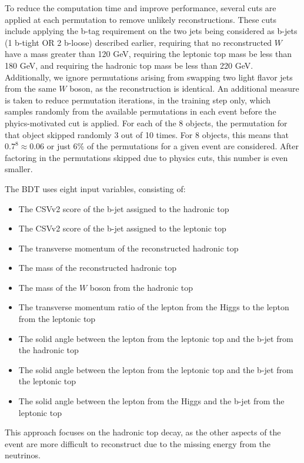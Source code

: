 To reduce the computation time and improve performance,
several cuts are applied at each permutation to remove unlikely reconstructions.
These cuts include applying the b-tag requirement on the two jets being considered
as b-jets (1 b-tight OR 2 b-loose) described earlier, requiring that no
reconstructed $W$ have a mass greater than 120 GeV, requiring the leptonic top mass
be less than 180 GeV, and requiring 
the hadronic top mass be less than 220 GeV. Additionally, we ignore permutations
arising from swapping two light flavor jets from the same $W$ boson, as the reconstruction is
identical. An additional measure is taken to reduce permutation iterations, in the training step only,
which samples randomly from the available permutations in each event before the phyics-motivated cut is applied.
For each of the 8 objects, the permutation for that object skipped randomly 3 out of 10 times. For 8 objects,
this means that $0.7^{8} \approx 0.06$ or just 6$\%$ of the permutations for a given event are considered. After factoring
in the permutations skipped due to physics cuts, this number is even smaller. 

The BDT uses eight input variables, consisting of:
\begin{itemize}
\item The CSVv2 score of the b-jet assigned to the hadronic top
\item The CSVv2 score of the b-jet assigned to the leptonic top
\item The transverse momentum of the reconstructed hadronic top
\item The mass of the reconstructed hadronic top
\item The mass of the $W$ boson from the hadronic top
\item The transverse momentum ratio of the lepton from the Higgs to the lepton from the leptonic top
\item The solid angle between the lepton from the leptonic top and the b-jet from the hadronic top
\item The solid angle between the lepton from the leptonic top and the b-jet from the leptonic top
\item The solid angle between the lepton from the Higgs and the b-jet from the leptonic top
\end{itemize}

\noindent This approach focuses on the hadronic top decay, as the other aspects of the event
are more difficult to reconstruct due to the missing energy from the neutrinos. 

